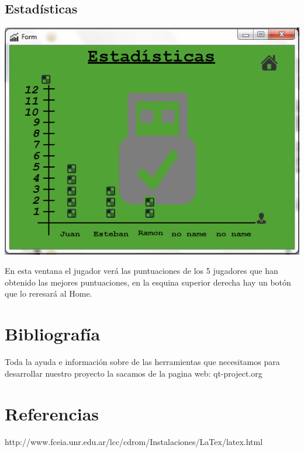 \documentclass[a4paper,11pt]{article}
\begin{document}
\subsection{Estadísticas}
\includegraphics{estadist.png}

En esta ventana el jugador verá las puntuaciones de los 5 jugadores que han obtenido las mejores puntuaciones, en la esquina superior derecha hay un botón que lo reresará al Home.



\section{Bibliografía}
Toda la ayuda e información sobre de las herramientas que necesitamos para desarrollar nuestro proyecto la sacamos de la pagina web:
qt-project.org
\section{Referencias}
http://www.fceia.unr.edu.ar/lcc/cdrom/Instalaciones/LaTex/latex.html
\end{document}
